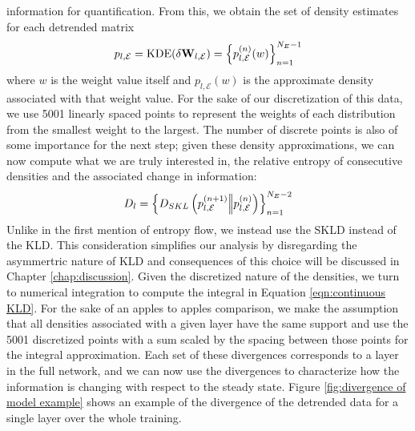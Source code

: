 information for quantification. From this, we obtain the set of density estimates for each detrended 
matrix
\begin{equation}
    p_{l,\mathcal{E}} = \text{KDE}(\delta{\bf W}_{l, \mathcal{E}}) = \left\{p_{l,\mathcal{E}}^{(n)}(w)\right\}_{n=1}^{N_E-1}
\end{equation}
where $w$ is the weight value itself and $p_{l,\mathcal{E}}(w)$ is the approximate density associated 
with that weight value. For the sake of our discretization of this data, we use 5001 linearly spaced 
points to represent the weights of each distribution from the smallest weight to the largest. The number 
of discrete points is also of some importance for the next step; given these density approximations, we 
can now compute what we are truly interested in, the relative entropy of consecutive densities and the 
associated change in information:
\begin{equation}
    D_l = \left\{D_{SKL}\left(p_{l,\mathcal{E}}^{(n+1)} \Big|\!\Big| p_{l,\mathcal{E}}^{(n)}\right)\right\}_{n=1}^{N_E-2}
\end{equation}
Unlike in the first mention of entropy flow, we instead use the SKLD instead of the KLD. This consideration
simplifies our analysis by disregarding the asymmertric nature of KLD and consequences of this choice 
will be discussed in Chapter \ref{chap:discussion}. Given the discretized nature of the densities, we turn 
to numerical integration to compute the integral in Equation \ref{eqn:continuous KLD}. For the sake of an 
apples to apples comparison, we make the assumption that all densities associated with a given layer 
have the same support and use the 5001 discretized points with a sum scaled by the spacing between those
points for the integral approximation. Each set of these divergences corresponds to a layer in the full 
network, and we can now use the divergences to characterize how the information is changing with respect 
to the steady state. Figure \ref{fig:divergence of model example} shows an example of the divergence 
of the detrended data for a single layer over the whole training. 

